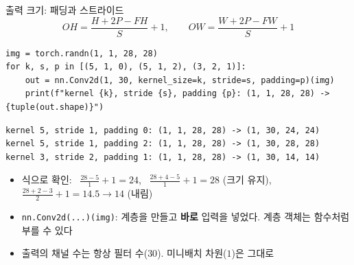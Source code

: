 \documentclass[aspectratio=169,11pt]{beamer}
\newcommand{\code}[1]{\texttt{#1}}
\begin{document}
\begin{frame}[fragile]{출력 크기: 패딩과 스트라이드}
\[
OH = \frac{H+2P-FH}{S}+1,\qquad OW = \frac{W+2P-FW}{S}+1
\]
\begin{lstlisting}
img = torch.randn(1, 1, 28, 28)
for k, s, p in [(5, 1, 0), (5, 1, 2), (3, 2, 1)]:
    out = nn.Conv2d(1, 30, kernel_size=k, stride=s, padding=p)(img)
    print(f"kernel {k}, stride {s}, padding {p}: (1, 1, 28, 28) -> {tuple(out.shape)}")
\end{lstlisting}
\begin{lstlisting}[style=outstyle]
kernel 5, stride 1, padding 0: (1, 1, 28, 28) -> (1, 30, 24, 24)
kernel 5, stride 1, padding 2: (1, 1, 28, 28) -> (1, 30, 28, 28)
kernel 3, stride 2, padding 1: (1, 1, 28, 28) -> (1, 30, 14, 14)
\end{lstlisting}
\small
\begin{itemize}
\item 식으로 확인: \ $\frac{28-5}{1}+1=24$, \ $\frac{28+4-5}{1}+1=28$ (크기 유지), \ $\frac{28+2-3}{2}+1=14.5\to14$ (내림)
\item \code{nn.Conv2d(...)(img)}: 계층을 만들고 \textbf{바로} 입력을 넣었다. 계층 객체는 함수처럼 부를 수 있다
\item 출력의 채널 수는 항상 필터 수($30$). 미니배치 차원($1$)은 그대로
\end{itemize}
\end{frame}
\end{document}
